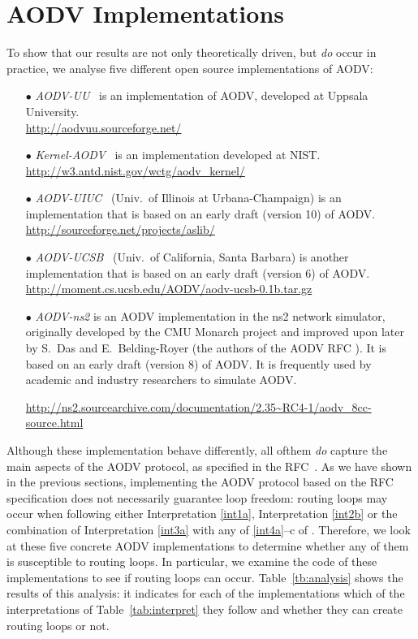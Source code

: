 \documentclass[letterpaper]{sig-alternate-pages}
\begin{document}
\section{AODV Implementations}\label{sec:implementation}
To show that our results are not only theoretically driven, but {\em do} occur in practice, 
we analyse five different open source implementations of AODV:
\begin{itemize}[leftmargin=8.6pt]
\setlength{\itemsep}{-1pt}
\item[$\bullet\!$] {\em AODV-UU}~\cite{AODVUU} is an implementation of AODV, developed at Uppsala University.\\
{\url{http://aodvuu.sourceforge.net/}}
\item[$\bullet\!$] {\em Kernel-AODV}~\cite{AODVNIST} is an implementation developed at NIST\!.\\
 {\url{http://w3.antd.nist.gov/wctg/aodv_kernel/}}
\item[$\bullet\!$] {\em AODV-UIUC}~\cite{Kawadia03} (Univ.~of Illinois at Urbana-Champaign) is an implementation that is based on an early draft (version 10) of AODV.\\ {\url{http://sourceforge.net/projects/aslib/}}
\item[$\bullet\!$] {\em AODV-UCSB}~\cite{CB04} (Univ.~of California, Santa Barbara) is another implementation that is based on an early draft (version 6) of AODV.\hspace{6mm}
\url{http://moment.cs.ucsb.edu/AODV/aodv-ucsb-0.1b.tar.gz}
\item[$\bullet\!$] {\em AODV-ns2\/} is an AODV implementation in the ns2 network simulator, originally developed by the CMU Monarch project and improved upon later by S.~Das and E.~Belding-Royer (the authors of the AODV RFC \cite{rfc3561}). It is based on an early draft (version 8) of AODV. It is frequently used by academic and industry researchers to simulate AODV. \\
\parbox{7.4cm}{\url{http://ns2.sourcearchive.com/documentation/2.35~RC4-1/aodv_8cc-source.html}}
\end{itemize}
Although these implementation behave differently, all of\linebreak them {\em do} capture
the main aspects of the AODV protocol, as specified in the RFC~\cite{rfc3561}. As we have shown in
the previous sections, implementing the AODV protocol based on the RFC specification does not
necessarily guarantee loop freedom: routing loops may occur when following either
  Interpretation \ref{int1a}, Interpretation \ref{int2b} or the combination of Interpretation \ref{int3a} with any of \ref{int4a}--c of .
Therefore, we look at these five concrete AODV implementations to determine whether any of them is susceptible to routing loops. In particular, we examine the code of these implementations to see if routing loops
can occur. 
Table~\ref{tb:analysis} shows the results of this analysis: it
indicates for each of the implementations which of the interpretations of Table~\ref{tab:interpret} they follow and whether they can create routing loops or not.
\end{document}

